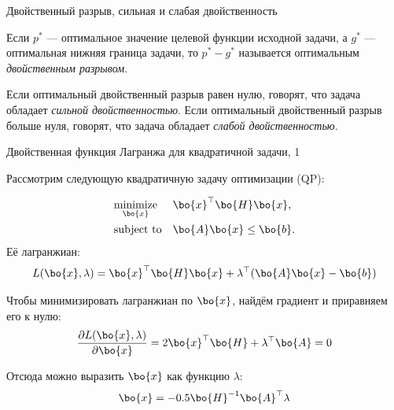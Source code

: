 \documentclass{beamer}
\begin{document}
\begin{frame}{Двойственный разрыв, сильная и слабая двойственность}
	\begin{flushleft}
		
		Если $p^*$ — оптимальное значение целевой функции исходной задачи, а $g^*$ — оптимальная нижняя граница задачи, то $p^* - g^*$ называется оптимальным \emph{двойственным разрывом}.
		
		\bigskip
		
		Если оптимальный двойственный разрыв равен нулю, говорят, что задача обладает \emph{сильной двойственностью}. Если оптимальный двойственный разрыв больше нуля, говорят, что задача обладает \emph{слабой двойственностью}.
		
	\end{flushleft}
\end{frame}
\begin{frame}{Двойственная функция Лагранжа для квадратичной задачи, 1}
	\begin{flushleft}
		
		Рассмотрим следующую квадратичную задачу оптимизации (QP):
		
		\begin{equation}
			\begin{aligned}
				& \underset{\bo{x}}{\text{minimize}}
				& & \bo{x}^\top \bo{H} \bo{x}, \\
				& \text{subject to}
				& & \bo{A}\bo{x} \leq \bo{b}.
			\end{aligned}
		\end{equation}
		Её лагранжиан:
		\begin{equation}
			L(\bo{x}, \lambda) = \bo{x}^\top \bo{H} \bo{x} + \lambda^\top (\bo{A}\bo{x} - \bo{b})
		\end{equation}
		
		Чтобы минимизировать лагранжиан по $\bo{x}$, найдём градиент и приравняем его к нулю:
		\begin{equation}
			\frac{\partial L(\bo{x}, \lambda)}{\partial \bo{x}} = 2\bo{x}^\top \bo{H} + \lambda^\top \bo{A} = 0
		\end{equation}
		
		Отсюда можно выразить $\bo{x}$ как функцию $\lambda$:
		\begin{equation}
			\bo{x} = -0.5\bo{H}^{-1}\bo{A}^\top \lambda
		\end{equation}
		
	\end{flushleft}
\end{frame}
\end{document}
